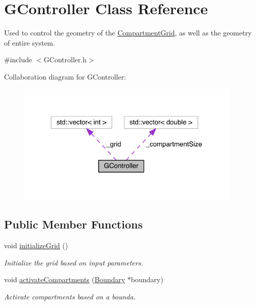 \hypertarget{classGController}{\section{G\+Controller Class Reference}
\label{classGController}
}


Used to control the geometry of the \hyperlink{classCompartmentGrid}{Compartment\+Grid}, as well as the geometry of entire system.  




{\ttfamily \#include $<$G\+Controller.\+h$>$}



Collaboration diagram for G\+Controller\+:\nopagebreak
\begin{figure}[H]
\begin{center}
\leavevmode
\includegraphics[width=304pt]{classGController__coll__graph}
\end{center}
\end{figure}
\subsection*{Public Member Functions}
\begin{DoxyCompactItemize}
\item 
void \hyperlink{classGController_ab6320a7a310d6693855c31c0da6e975d}{initialize\+Grid} ()
\begin{DoxyCompactList}\small\item\em Initialize the grid based on input parameters. \end{DoxyCompactList}\item 
void \hyperlink{classGController_ab035cc1a9b6822a3342a049c88ac9805}{activate\+Compartments} (\hyperlink{classBoundary}{Boundary} $\ast$boundary)
\begin{DoxyCompactList}\small\item\em Activate compartments based on a bounda. \end{DoxyCompactList}\end{DoxyCompactItemize}
